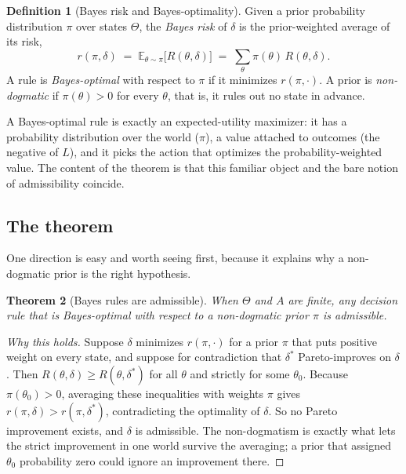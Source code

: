 \documentclass[10pt]{article}
\newtheorem{theorem}{Theorem}[section]
\theoremstyle{definition}
\newtheorem{definition}[theorem]{Definition}
\theoremstyle{remark}
\newcommand{\E}{\mathbb{E}}
\begin{document}
\begin{definition}[Bayes risk and Bayes-optimality]
\label{def:bayes}
Given a prior probability distribution $\pi$ over states $\Theta$, the \emph{Bayes risk} of $\delta$ is the prior-weighted average of its risk,
\[
r(\pi, \delta) \;=\; \E_{\theta \sim \pi}\big[ R(\theta, \delta) \big] \;=\; \sum_{\theta} \pi(\theta)\, R(\theta, \delta).
\]
A rule is \emph{Bayes-optimal} with respect to $\pi$ if it minimizes $r(\pi, \cdot)$. A prior is \emph{non-dogmatic} if $\pi(\theta) > 0$ for every $\theta$, that is, it rules out no state in advance.
\end{definition}

A Bayes-optimal rule is exactly an expected-utility maximizer: it has a probability distribution over the world ($\pi$), a value attached to outcomes (the negative of $L$), and it picks the action that optimizes the probability-weighted value. The content of the theorem is that this familiar object and the bare notion of admissibility coincide.

\subsection{The theorem}

One direction is easy and worth seeing first, because it explains why a non-dogmatic prior is the right hypothesis.

\begin{theorem}[Bayes rules are admissible]
\label{thm:cc-easy}
When $\Theta$ and $A$ are finite, any decision rule that is Bayes-optimal with respect to a non-dogmatic prior $\pi$ is admissible.
\end{theorem}

\begin{proof}[Why this holds]
Suppose $\delta$ minimizes $r(\pi, \cdot)$ for a prior $\pi$ that puts positive weight on every state, and suppose for contradiction that $\delta^*$ Pareto-improves on $\delta$. Then $R(\theta, \delta) \ge R(\theta, \delta^*)$ for all $\theta$ and strictly for some $\theta_0$. Because $\pi(\theta_0) > 0$, averaging these inequalities with weights $\pi$ gives $r(\pi, \delta) > r(\pi, \delta^*)$, contradicting the optimality of $\delta$. So no Pareto improvement exists, and $\delta$ is admissible. The non-dogmatism is exactly what lets the strict improvement in one world survive the averaging; a prior that assigned $\theta_0$ probability zero could ignore an improvement there.
\end{proof}
\end{document}

